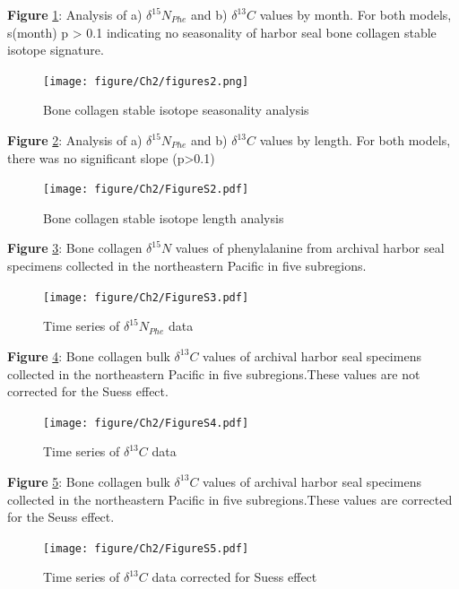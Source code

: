 \documentclass [11pt, proquest] {uwthesis}[2015/03/03]
\begin{document}
\textbf{Figure} \ref{fig:Month}: Analysis of a) \(\delta^{15}N_{Phe}\) and b) \(\delta^{13}C\) values by month. For both models, s(month) p \textgreater{} 0.1 indicating no seasonality of harbor seal bone collagen stable isotope signature.\\
\newline 
\begin{figure}[h]
  \centering
  \texttt{[image: figure/Ch2/figures2.png]}
  \caption{Bone collagen stable isotope seasonality analysis}
  \label{fig:Month}
\end{figure}
\clearpage

\textbf{Figure} \ref{fig:Length}: Analysis of a) \(\delta^{15}N_{Phe}\) and b) \(\delta^{13}C\) values by length. For both models, there was no significant slope (p\textgreater0.1)
\newline 
\begin{figure}[h]
\centering
  \texttt{[image: figure/Ch2/FigureS2.pdf]}
  \caption{Bone collagen stable isotope length analysis}
  \label{fig:Length}
\end{figure}
\clearpage

\textbf{Figure} \ref{fig:TSphe}: Bone collagen \(\delta^{15}N\) values of phenylalanine from archival harbor seal specimens collected in the northeastern Pacific in five subregions.
\newline 
\begin{figure}[h]
\centering
  \texttt{[image: figure/Ch2/FigureS3.pdf]}
  \caption{Time series of $\delta^{15}N_{Phe}$ data}
  \label{fig:TSphe}
\end{figure}
\clearpage

\textbf{Figure} \ref{fig:nonSuess}: Bone collagen bulk \(\delta^{13}C\) values of archival harbor seal specimens collected in the northeastern Pacific in five subregions.These values are not corrected for the Suess effect.
\newline 
\begin{figure}[h]
\centering
  \texttt{[image: figure/Ch2/FigureS4.pdf]}
  \caption{Time series of $\delta^{13}C$ data}
  \label{fig:nonSuess}
\end{figure}
\clearpage

\textbf{Figure} \ref{fig:Suess}: Bone collagen bulk \(\delta^{13}C\) values of archival harbor seal specimens collected in the northeastern Pacific in five subregions.These values are corrected for the Seuss effect.
\newline 
\begin{figure}[h]
\centering
  \texttt{[image: figure/Ch2/FigureS5.pdf]}
  \caption{Time series of $\delta^{13}C$ data corrected for Suess effect}
  \label{fig:Suess}
\end{figure}
\clearpage
\end{document}
